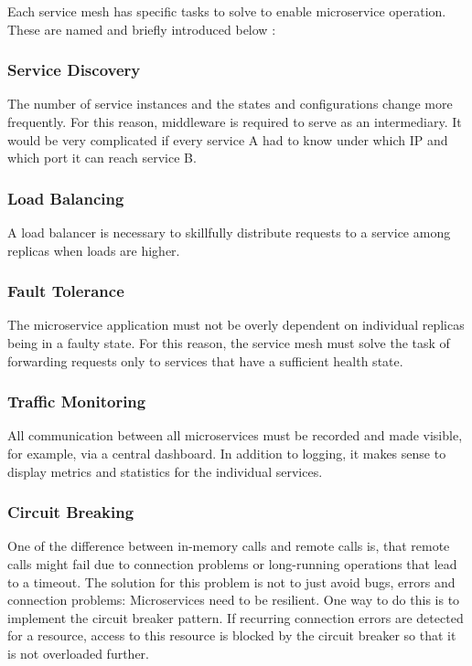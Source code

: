 Each service mesh has specific tasks to solve to enable microservice operation. These are named and briefly introduced below \cite{sm1}:

\subsubsection{Service Discovery}

The number of service instances and the states and configurations change more frequently. For this reason, middleware is required to serve as an intermediary. It would be very complicated if every service A had to know under which IP and which port it can reach service B.

\subsubsection{Load Balancing}

A load balancer is necessary to skillfully distribute requests to a service among replicas when loads are higher.

\subsubsection{Fault Tolerance}

The microservice application must not be overly dependent on individual replicas being in a faulty state. For this reason, the service mesh must solve the task of forwarding requests only to services that have a sufficient health state.

\subsubsection{Traffic Monitoring}

All communication between all microservices must be recorded and made visible, for example, via a central dashboard. In addition to logging, it makes sense to display metrics and statistics for the individual services.

\subsubsection{Circuit Breaking}
One of the difference between in-memory calls and remote calls is, that remote calls might fail due to connection problems or long-running operations that lead to a timeout. The solution for this problem is not to just avoid bugs, errors and connection problems: Microservices need to be resilient. One way to do this is to implement the circuit breaker pattern. If recurring connection errors are detected for a resource, access to this resource is blocked by the circuit breaker so that it is not overloaded further.

